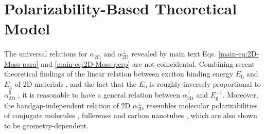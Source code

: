 \documentclass[manuscript=suppinfo,email=true,hyperref=true,keywords=false]{achemso}
\begin{document}
\section{Polarizability-Based Theoretical Model}
\label{sec:theory-1}
The universal relations for $\alpha_{\mathrm{2D}}^{\parallel}$ and
$\alpha_{\mathrm{2D}}^{\perp}$ revealed by main text
Eqs. \ref{main-eq:2D-Moss-para} and \ref{main-eq:2D-Moss-perp} are not
coincidental. Combining recent theoretical findings of the linear
relation between exciton binding energy $E_{\mathrm{b}}$ and
$E_{\mathrm{g}}$ of 2D materials
\cite{Choi_linear_2015,Olsen_2016_hydrogen,Jiang_2017_Eg_Eb}, and the
fact that the $E_{\mathrm{b}}$ is roughly inversely proportional to
$\alpha_{\mathrm{2D}}^{\parallel}$ \cite{Pulci_2014}, it is reasonable
to have a general relation between
$\alpha_{\mathrm{2D}}^{\parallel}$ and $E_{\mathrm{g}}^{-1}$. Moreover,
the bandgap-independent relation of 2D $\alpha_{\mathrm{2D}}^{\perp}$
resembles molecular polarizabilities of conjugate molecules
\cite{Davies_1952}, fullerenes \cite{Sabirov_2014} and carbon
nanotubes \cite{Benedict_1995}, which are also shown to be
geometry-dependent.
\end{document}
